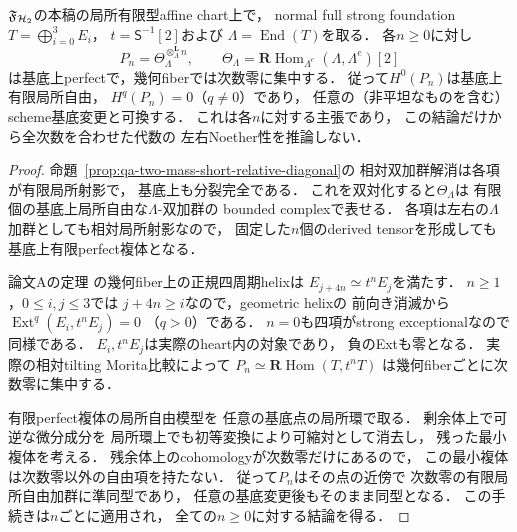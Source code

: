 \begin{lemma}
\label{lem:qa-q12-all-degree-perfect-fiber}
$\mathfrak F_{\mathcal H_2}$の本稿の局所有限型affine chart上で，
normal full strong foundation
$T=\bigoplus_{i=0}^3E_i$，
$t=\mathsf S^{-1}[2]$および
$\Lambda=\operatorname{End}(T)$を取る．
各$n\ge0$に対し
\[
 P_n=\Theta_\Lambda^{\otimes_\Lambda^{\mathbf L}n},
 \qquad
 \Theta_\Lambda=
 \mathbf R\operatorname{Hom}_{\Lambda^e}(\Lambda,\Lambda^e)[2]
\]
は基底上perfectで，幾何fiberでは次数零に集中する．
従って$H^0(P_n)$は基底上有限局所自由，
$H^q(P_n)=0$（$q\ne0$）であり，
任意の（非平坦なものを含む）scheme基底変更と可換する．
これは各$n$に対する主張であり，
この結論だけから全次数を合わせた代数の
左右Noether性を推論しない．
\end{lemma}
\begin{proof}
命題~\ref{prop:qa-two-mass-short-relative-diagonal}の
相対双加群解消は各項が有限局所射影で，
基底上も分裂完全である．
これを双対化すると$\Theta_\Lambda$は
有限個の基底上局所自由な$\Lambda$-双加群の
bounded complexで表せる．
各項は左右の$\Lambda$加群としても相対局所射影なので，
固定した$n$個のderived tensorを形成しても
基底上有限perfect複体となる．

論文Aの定理
\cite[\texttt{thm:normal-helix}]{QuadricIntrinsic2026}
の幾何fiber上の正規四周期helixは
$E_{j+4n}\simeq t^nE_j$を満たす．
$n\ge1$，$0\le i,j\le3$では
$j+4n\ge i$なので，geometric helixの
前向き消滅から
$\operatorname{Ext}^q(E_i,t^nE_j)=0$
（$q>0$）である．
$n=0$も四項がstrong exceptionalなので同様である．
$E_i,t^nE_j$は実際のheart内の対象であり，
負のExtも零となる．
実際の相対tilting Morita比較によって
$P_n\simeq\mathbf R\operatorname{Hom}(T,t^nT)$
は幾何fiberごとに次数零に集中する．

有限perfect複体の局所自由模型を
任意の基底点の局所環で取る．
剰余体上で可逆な微分成分を
局所環上でも初等変換により可縮対として消去し，
残った最小複体を考える．
残余体上のcohomologyが次数零だけにあるので，
この最小複体は次数零以外の自由項を持たない．
従って$P_n$はその点の近傍で
次数零の有限局所自由加群に準同型であり，
任意の基底変更後もそのまま同型となる．
この手続きは$n$ごとに適用され，
全ての$n\ge0$に対する結論を得る．
\end{proof}

